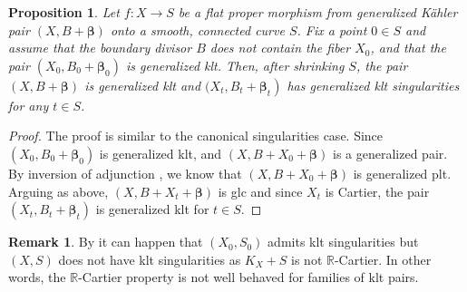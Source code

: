 \documentclass[12pt]{amsart}
\numberwithin{equation}{section}
\newtheorem{proposition}[theorem]{Proposition}
\theoremstyle{definition}
\newtheorem{example}  [theorem]     {Example}
\theoremstyle{plain}
\newtheorem*{thm A*}{Theorem A}
\newtheorem*{thm B*}{Theorem B}
\newtheorem*{thm C*}{Theorem C}
\newtheorem*{thm D*}{Theorem D}
\theoremstyle{definition}
\newtheorem{remark}  [theorem]     {Remark}
\renewcommand{\1}{\mathds{1}}
\renewcommand{\>}{\rightarrow}
\begin{document}
\begin{proposition}\label{DefKLT}
Let $f: X \rightarrow S$ be a flat proper morphism from %
generalized K\"ahler pair $(X, B+ { \boldsymbol{\beta}})$ onto a smooth, connected curve $S$. Fix a point $0\in S$ and assume that the boundary divisor $B$ does not contain the fiber $X_0$, and that the pair $(X_0, B_0+ { \boldsymbol{\beta}}_0)$ is generalized klt. Then, after shrinking $S$, the pair $(X, B+ { \boldsymbol{\beta}})$ is generalized klt and  $(X_t, B_t+\left. { \boldsymbol{\beta}}_t\right)$ has generalized klt singularities for any $t\in S$.
\end{proposition}

\begin{proof}
The proof is similar to the canonical singularities case. Since $(X_0,B_0 +  { \boldsymbol{\beta}}_0)$ is generalized klt, and $(X,B+X_0+ { \boldsymbol{\beta}})$ is a generalized pair. By inversion of adjunction \cite[Theorem 0.1]{HP24}, we know that $(X,B+X_0+  { \boldsymbol{\beta}})$ is generalized plt. Arguing as above, $(X,B+X_t+  { \boldsymbol{\beta}})$ is glc and since $X_t$ is Cartier, the pair $(X_t, B_t +  { \boldsymbol{\beta}}_t)$ is generalized klt for $t\in S$.
\end{proof}

\begin{remark}
By \cite{Kawamata99} it can happen that $(X_0, S_0)$ admits klt singularities but $(X,S)$ does not have klt singularities as $K_X+S$ is not $\mathbb R$-Cartier.  In other words, the $\mathbb R$-Cartier property is not well behaved for families of klt pairs. 
\end{remark}
\end{document}

